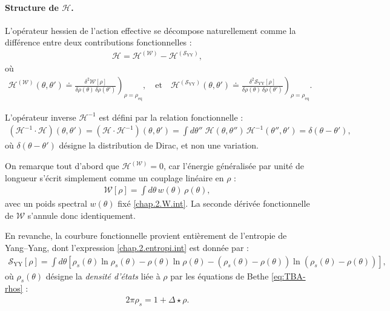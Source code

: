 \paragraph{Structure de \(\mathcal{H}\).}

L’opérateur hessien de l’action effective se décompose naturellement comme la différence entre deux contributions fonctionnelles :
\begin{eqnarray}
	\mathcal{H} = \mathcal{H}^{(\mathcal{W})} - \mathcal{H}^{(\mathcal{S}_{\mathrm{YY}})},
\end{eqnarray}
où
\begin{eqnarray}
	\mathcal{H}^{(\mathcal{W})}(\theta,\theta') \doteq \left. \frac{\delta^2 \mathcal{W}[\rho]}{\delta \rho(\theta)\, \delta \rho(\theta')} \right)_{\rho = \rho_{\mathrm{eq}}}, \quad \text{et} \quad \mathcal{H}^{(\mathcal{S}_{\mathrm{YY}})}(\theta,\theta') \doteq \left. \frac{\delta^2 \mathcal{S}_{\mathrm{YY}}[\rho]}{\delta \rho(\theta)\, \delta \rho(\theta')} \right)_{\rho = \rho_{\mathrm{eq}}}.
\end{eqnarray}

L’opérateur inverse \(\mathcal{H}^{-1}\) est défini par la relation fonctionnelle :
\begin{eqnarray}
	(\mathcal{H}^{-1} \cdot \mathcal{H})(\theta, \theta') = (\mathcal{H} \cdot \mathcal{H}^{-1})(\theta, \theta') = \int d\theta'' \; \mathcal{H}(\theta, \theta'')\, \mathcal{H}^{-1}(\theta'', \theta') = \delta(\theta - \theta'),
	\label{chap:fluctu:eq:hessienner.prod.inv} 	
\end{eqnarray}
où \(\delta(\theta - \theta')\) désigne la distribution de Dirac, et non une variation.

\medskip

On remarque tout d’abord que \(\mathcal{H}^{(\mathcal{W})} = 0\), car l’énergie généralisée par unité de longueur s’écrit simplement comme un couplage linéaire en \(\rho\) :
\begin{eqnarray*}
	\mathcal{W}[\rho] = \int d\theta \, w(\theta)\, \rho(\theta),
\end{eqnarray*}
avec un poids spectral \(w(\theta)\) fixé \eqref{chap.2.W.int}. La seconde dérivée fonctionnelle de \(\mathcal{W}\) s’annule donc identiquement.

En revanche, la courbure fonctionnelle provient entièrement de l'entropie de Yang–Yang, dont l’expression \eqref{chap.2.entropi.int} est donnée par :
\begin{eqnarray}
	\mathcal{S}_{\mathrm{YY}}[\rho] = \int d\theta \left[
	\rho_s(\theta) \ln \rho_s(\theta) - \rho(\theta) \ln \rho(\theta) - (\rho_s(\theta) - \rho(\theta)) \ln(\rho_s(\theta) - \rho(\theta))
	\right] \label{chap.4.entropi.int},
\end{eqnarray}
où \(\rho_s(\theta)\) désigne la {\em densité d’états} liée à \(\rho\) par les équations de Bethe \eqref{eq:TBA-rhos} :
\begin{eqnarray}
	2\pi \rho_s = 1 + \Delta \star \rho.	
\end{eqnarray}



